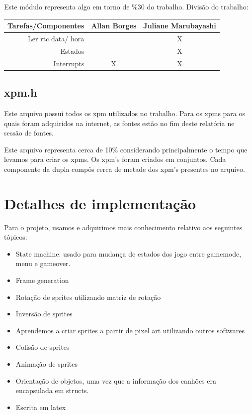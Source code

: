 \documentclass[12pt]{article}
\begin{document}
Este módulo representa algo em torno de \%30 do trabalho. \newline
Divisão do trabalho: \newline 
\begin{center}
    \begin{tabular}{|r|c|c|}
        \hline
        \textbf{Tarefas/Componentes} & \textbf{Allan Borges} & \textbf{Juliane Marubayashi} \\ 
        \hline
        Ler rtc data/ hora & & X \\ 
        Estados & & X \\ 
        Interrupts& X & X \\ 
        \hline
    \end{tabular}
\end{center}

\subsection{xpm.h}
Este arquivo possui todos os xpm utilizados no trabalho. \newline
Para os xpms para os quais foram adquiridos na internet, as fontes estão
no fim deste relatória ne sessão de fontes. 

Este arquivo representa cerca de 10\% considerando principalmente o tempo que levamos para
criar os xpms. \newline
Os xpm's foram criados em conjuntos. Cada componente da dupla compôs cerca de metade dos xpm's
presentes no arquivo. 
\section{Detalhes de implementação}

Para o projeto, usamos e adquirimos mais conhecimento relativo aos seguintes tópicos: 
\begin{itemize}
    \item State machine: usado para mudança de estados dos jogo entre gamemode, menu e gameover. 
    \item Frame generation 
    \item Rotação de sprites utilizando matriz de rotação 
    \item Inversão de sprites 
    \item Aprendemos a criar sprites a partir de pixel art utilizando outros softwares
    \item Colisão de sprites
    \item Animação de sprites 
    \item Orientação de objetos, uma vez que a informação dos canhões era encapsulada em structs. 
    \item Escrita em latex
\end{itemize}
\end{document}
